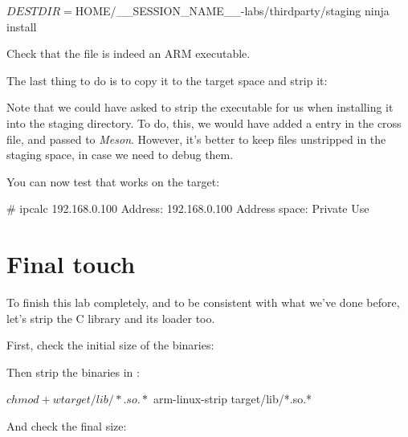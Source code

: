 \begin{bashinput}
$ DESTDIR=$HOME/__SESSION_NAME__-labs/thirdparty/staging ninja install
\end{bashinput}

Check that the  file is indeed an ARM
executable.

The last thing to do is to copy it to the target space and strip it:


Note that we could have asked  to strip the
executable for us when installing it into the staging directory.
To do, this, we would have added a  entry in the cross file,
and passed  to {\em Meson}. However, it's better to keep
files unstripped in the staging space, in case we need to debug them.

You can now test that  works on the target:

\begin{bashinput}
# ipcalc 192.168.0.100
Address:	192.168.0.100
Address space:	Private Use
\end{bashinput}

\section{Final touch}

To finish this lab completely, and to be consistent with what we've done before,
let's strip the C library and its loader too.

First, check the initial size of the binaries:

Then strip the binaries in :
\begin{bashinput}
$ chmod +w target/lib/*.so.*
$ arm-linux-strip target/lib/*.so.*
\end{bashinput}

And check the final size:
